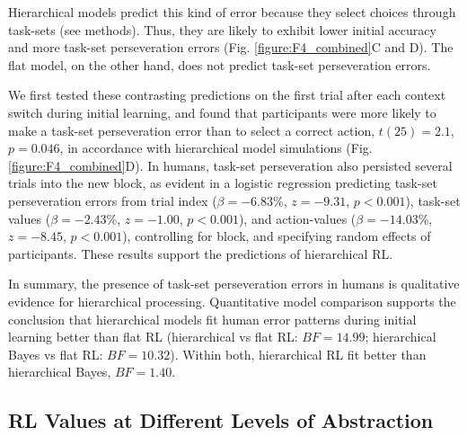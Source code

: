 \documentclass[10pt,letterpaper]{article}  %
\begin{document}
Hierarchical models predict this kind of error because they select choices through task-sets (see methods). Thus, they are likely to exhibit lower initial accuracy and more task-set perseveration errors (Fig. \ref{figure:F4_combined}C and D). The flat model, on the other hand, does not predict task-set perseveration errors. %

We first tested these contrasting predictions on the first trial after each context switch during initial learning, and found that participants were more likely to make a task-set perseveration error than to select a correct action, $t(25)=2.1$, $p=0.046$, in accordance with hierarchical model simulations (Fig. \ref{figure:F4_combined}D). In humans, task-set perseveration also persisted several trials into the new block, as evident in a logistic regression predicting task-set perseveration errors from trial index ($\beta=-6.83$\%, $z=-9.31$, $p<0.001$), task-set values ($\beta=-2.43$\%, $z=-1.00$, $p<0.001$), and action-values ($\beta=-14.03$\%, $z=-8.45$, $p<0.001$), controlling for block, and specifying random effects of participants. These results support the predictions of hierarchical RL.

In summary, the presence of task-set perseveration errors in humans is qualitative evidence for hierarchical processing. Quantitative model comparison supports the conclusion that hierarchical models fit human error patterns during initial learning better than flat RL (hierarchical vs flat RL: $BF=14.99$; hierarchical Bayes vs flat RL: $BF=10.32$). Within both, hierarchical RL fit better than hierarchical Bayes, $BF=1.40$.

\subsection*{RL Values at Different Levels of Abstraction}
\end{document}
